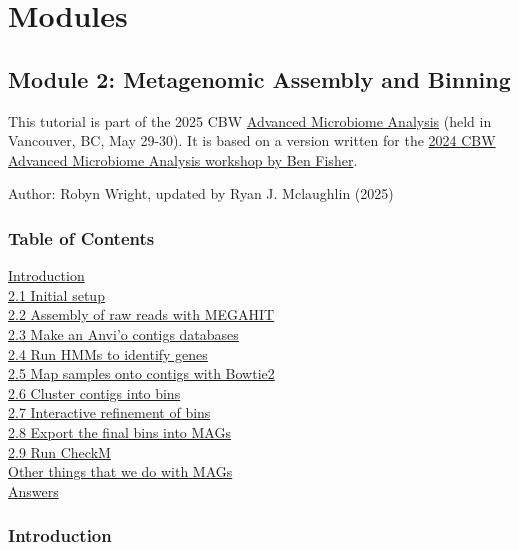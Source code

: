 \documentclass[
]{book}
\begin{document}
\part{Modules}\label{part-modules-1}

\chapter{Module 2: Metagenomic Assembly and Binning}\label{module-2-metagenomic-assembly-and-binning}

This tutorial is part of the 2025 CBW \href{https://bioinformaticsdotca.github.io/AMB_2025/}{Advanced Microbiome Analysis} (held in Vancouver, BC, May 29-30). It is based on a version written for the \href{https://bioinformaticsdotca.github.io/AMB_2024_module1}{2024 CBW Advanced Microbiome Analysis workshop by Ben Fisher}.

Author: Robyn Wright, updated by Ryan J. Mclaughlin (2025)

\section{Table of Contents}\label{table-of-contents}

\hyperref[introduction]{Introduction}\\
\hyperref[21-initial-setup]{2.1 Initial setup}\\
\hyperref[22-assembly-of-raw-reads-with-megahit]{2.2 Assembly of raw reads with MEGAHIT}\\
\hyperref[23-make-an-anvio-contigs-databases]{2.3 Make an Anvi'o contigs databases}\\
\hyperref[24-run-hmms-to-identify-single-copy-genes]{2.4 Run HMMs to identify genes}\\
\hyperref[25-map-samples-onto-contigs-with-bowtie2]{2.5 Map samples onto contigs with Bowtie2}\\
\hyperref[26-cluster-contigs-into-bins]{2.6 Cluster contigs into bins}\\
\hyperref[27-interactive-refinement-of-bins]{2.7 Interactive refinement of bins}\\
\hyperref[28-export-the-final-bins-into-mags]{2.8 Export the final bins into MAGs}\\
\hyperref[29-run-checkm]{2.9 Run CheckM}\\
\hyperref[other-things-that-we-frequently-do-with-mags]{Other things that we do with MAGs}\\
\hyperref[answers]{Answers}

\section{Introduction}\label{introduction}
\end{document}
